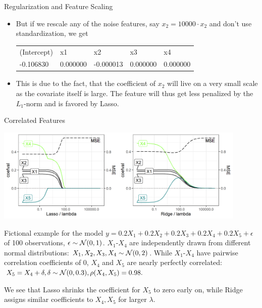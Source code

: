 \begin{vbframe}{Regularization and Feature Scaling}
\begin{itemize}
\normalsize
\item But if we rescale any of the noise features, say $x_2 = 10000 \cdot x_2$ and don't use standardization, we get
\footnotesize
\vspace{0.2cm}

\begin{table}[]
\begin{tabular}{lllll}
(Intercept) & x1       & x2        & x3       & x4       \\
-0.106830   & 0.000000 & -0.000013 & 0.000000 & 0.000000
\end{tabular}
\end{table}

\normalsize

\item This is due to the fact, that the coefficient of $x_2$ will live on a very small scale as the covariate itself is large. The feature will thus get less penalized by the $L_1$-norm and is favored by Lasso.
\end{itemize}

\end{vbframe}

\begin{vbframe}{Correlated Features}


\includegraphics[width=0.9\textwidth]{figure_man/regu_example_multicollinearity.png}

Fictional example for the model $y = 0.2X_1 + 0.2X_2 + 0.2X_3 + 0.2X_4 + 0.2X_5 + \epsilon$ of 100 observations, $\epsilon \sim \mathcal{N} (0,1)$. $X_1$-$X_4$ are independently drawn from different normal distributions: $X_1, X_2, X_3, X_4 \sim \mathcal{N} (0,2)$. While $X_1$-$X_4$ have pairwise correlation coefficients of 0, $X_4$ and $X_5$ are nearly perfectly correlated: $X_5 = X_4 + \delta, \delta \sim \mathcal{N} (0,0.3), \rho(X_4, X_5) = 0.98. $

\vspace{0.1cm}

We see that Lasso shrinks the coefficient for $X_5$ to zero early on, while Ridge assigns similar coefficients to $X_4, X_5$ for larger $\lambda$.

\end{vbframe}


